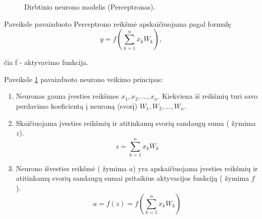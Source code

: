 \begin{figure}
  \centering
{}
\caption{Dirbtinio neurono modelis (Perceptronas).}
\label{fig:perceptron}
\end{figure}

Paveiksle pavaizduoto Perceptrono reikšmė apskaičiuojama pagal formulę
\begin{equation*}
  y = f \left(\sum_{k=1}^{n} x_k W_k \right),
\end{equation*}

čia f - aktyvavimo funkcija.

Paveiksle \ref{fig:perceptron} pavaizduoto neurono veikimo principas:
\begin{enumerate}

\item Neuronas gauna įvesties reikšmes $x_1, x_2, ... , x_n$. Kiekviena iš reikšmių turi savo perdavimo koeficientą į neuroną (svorį) $W_1, W_2, ... , W_n$.
\item  Skaičiuojama įvesties reikšmių ir atitinkamų svorių sandaugų suma ( žymima $z$).
\begin{equation*}
  z = \sum_{k=1}^{n} x_k W_k
\end{equation*}

\item  Neurono išvesties reikšmė ( žymima $a$) yra apskaičiuojama įvesties reikšmių ir atitinkamų svorių sandaugų sumai pritaikius aktyvacijos funkciją ( žymima $f$).
\begin{equation*}
  a = f(z) = f(\sum_{k=1}^{n} x_k W_k)
\end{equation*}
\end{enumerate}

